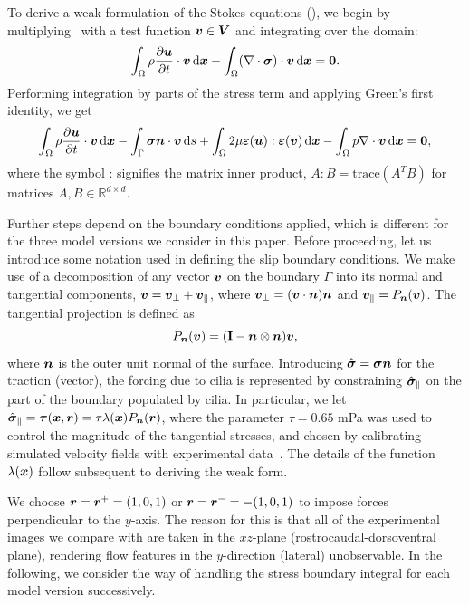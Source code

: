 \documentclass{WileyMSP-template}
\begin{document}
To derive a weak formulation of the Stokes equations (),
we begin by multiplying~ with a
test function $\bm{v}\in\bm{V}$ and integrating over the domain:
\begin{equation*}
    \int_{\Omega}\rho\frac{\partial \bm{u}}{\partial t}\cdot\bm{v} \, \mathrm d\bm{x} - \int_{\Omega}(\nabla\cdot\bm{\sigma})\cdot\bm{v} \, \mathrm d\bm{x} = \mathbf{0}.
\end{equation*}
Performing integration by parts of the stress term and applying Green's first identity, we get
\begin{equation}
    \int_{\Omega}\rho\frac{\partial \bm{u}}{\partial t}\cdot\bm{v} \, \mathrm d\bm{x}
    - \int_{\Gamma}\bm{\sigma}\bm{n}\cdot\bm{v} \, \mathrm ds
    + \int_{\Omega}2\mu\bm{\varepsilon}(\bm{u}) : \bm{\varepsilon}(\bm{v}) \, \mathrm d\bm{x}
    - \int_{\Omega}p\nabla\cdot\bm{v} \, \mathrm d\bm{x} = \mathbf{0}, \label{eq:modelA_weak_form1}
\end{equation}
where the symbol : signifies the matrix inner product,
$A:B=\text{trace}{(A^TB)}$ for matrices $A, B\in\mathbb{R}^{d\times d}$. 

Further steps depend on the boundary conditions applied,
which is different for the three model versions we consider in this paper.
Before proceeding, let us introduce some notation used in defining the
slip boundary conditions. We make use of a decomposition
of any vector $\bm{v}$ on the boundary $\Gamma$ into its normal and tangential components,
$\bm{v} = \bm{v}_{\perp} + \bm{v}_{\parallel}$, where $\bm{v}_{\perp}=(\bm{v}\cdot\bm{n})\bm{n}$ and
$\bm{v}_{\parallel}=P_{\bm{n}}(\bm{v})$. The tangential projection is defined as
\begin{equation}
    P_{\bm{n}}(\bm{v}) = (\mathbf{I} - \bm{n}\otimes\bm{n})\bm{v},
    \label{eq:projection_operator_appendix}
\end{equation}
where $\bm{n}$ is the outer unit normal of the surface. Introducing
$\hat{\bm{\sigma}} = \bm{\sigma}\bm{n}$ for the traction (vector), the forcing due
to cilia is represented by constraining $\hat{\bm{\sigma}}_{\parallel}$ on the part of the
boundary populated by cilia. In particular, we let
$\hat{\bm{\sigma}}_{\parallel} = \bm{\tau}(\bm{x}, \bm{r}) = \tau\lambda(\bm{x}) P_{\bm{n}}(\bm{r})$,
where the parameter $\tau=0.65$ mPa was used to control the magnitude
of the tangential stresses, and chosen by calibrating simulated velocity
fields with experimental data~\cite{Olstad2019CiliaryDevelopment}.
The details of the function $\lambda(\bm{x})$ follow subsequent to deriving the weak form.

We choose $\bm{r} = \bm{r}^+ = (1, 0, 1)$ or $\bm{r} = \bm{r}^- = -(1, 0, 1)$
to impose forces perpendicular to the $y$-axis.
The reason for this is that all of the experimental images we compare
with are taken in the $xz$-plane (rostrocaudal-dorsoventral plane),
rendering flow features in the $y$-direction (lateral) unobservable.
In the following, we consider the way of handling the stress
boundary integral for each model version successively. 
\end{document}
